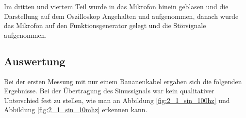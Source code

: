 \documentclass[12pt,a4paper]{article}
\begin{document}
Im dritten und viertem Teil wurde in das Mikrofon hinein geblasen und die Darstellung auf dem Oszilloskop Angehalten und aufgenommen, danach wurde das Mikrofon auf den Funktionsgenerator gelegt und die Störsignale aufgenommen.


\subsection{Auswertung}
Bei der ersten Messung mit nur einem Bananenkabel ergaben sich die folgenden Ergebnisse.
Bei der Übertragung des Sinussignals war kein qualitativer Unterschied fest zu stellen, wie man an Abbildung \ref{fig:2_1_sin_100hz} und Abbildung \ref{fig:2_1_sin_10mhz} erkennen kann.
\end{document}

